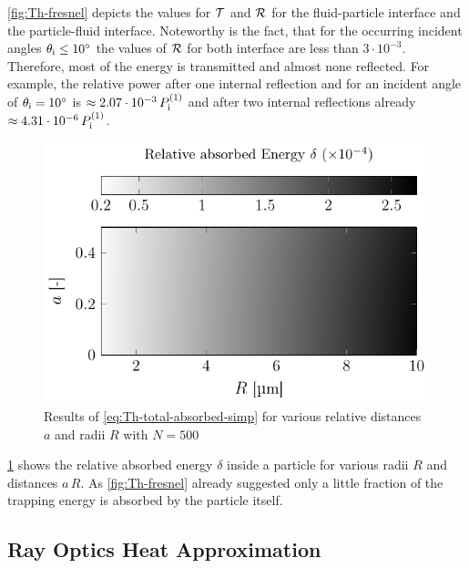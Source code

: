 \cref{fig:Th-fresnel} depicts the values for $\mathcal{T}$ and $\mathcal{R}$ for 
the fluid-particle interface and the particle-fluid interface. Noteworthy is 
the fact, that for the occurring incident angles $\theta_{\mathrm{i}} \leq 
\SI{10}{\degree}$ the values of $\mathcal{R}$ for both interface are less than 
$3\cdot 10^{-3}$. Therefore, most of the energy is transmitted and almost none 
reflected. For example, the relative power after one internal reflection and 
for an incident angle of $\theta_{\mathrm{i}}=\SI{10}{\degree}$ is $\approx 2.07\cdot 
10^{-3}\,P_{\mathrm{i}}^{(1)}$ and after two internal reflections already $\approx 
4.31\cdot 10^{-6}\,P_{\mathrm{i}}^{(1)}$.

\begin{figure}[tbp]
  \centering
  \includegraphics[]{Plots/cache/absorbed_energies.pdf}
  \caption{Results of \cref{eq:Th-total-absorbed-simp} for various relative 
  distances $a$ and radii $R$ with $N=500$ }
  \label{fig:Th-absorbed_energies}
\end{figure}

\cref{fig:Th-absorbed_energies} shows the relative absorbed energy $\delta$ 
inside a particle for various radii $R$ and distances $a\,R$. As 
\cref{fig:Th-fresnel} already suggested only a little fraction of the trapping 
energy is absorbed by the particle itself.

\subsection{Ray Optics Heat Approximation}

